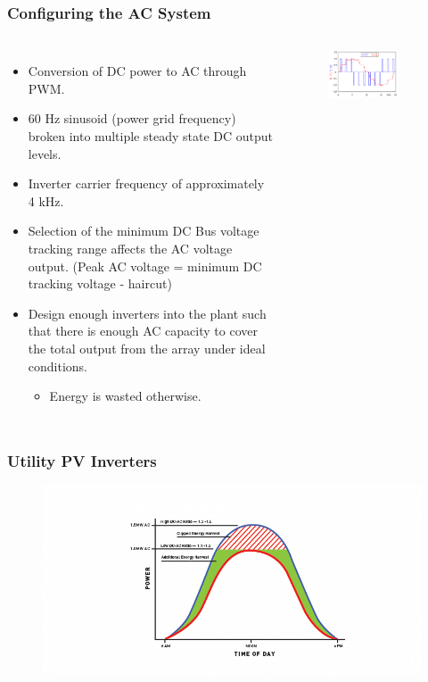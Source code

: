 \documentclass[aspectratio=169]{beamer}
\begin{document}
\begin{frame}
  \frametitle{Configuring the AC System}
  \begin{columns}[t]
    \begin{itemize}
    \item Conversion of DC power to AC through PWM.
    \item 60 Hz sinusoid (power grid frequency) broken into multiple
      steady state DC output levels.
    \item Inverter carrier frequency of approximately 4 kHz.
    \item Selection of the minimum DC Bus voltage tracking range
      affects the AC voltage output. (Peak AC voltage = minimum DC
      tracking voltage - haircut)
    \item Design enough inverters into the plant such that there is
      enough AC capacity to cover the total output from the array
      under ideal conditions.
      \begin{itemize}
      \item Energy is wasted otherwise.
      \end{itemize}
    \end{itemize}

    \begin{figure}
      \includegraphics[width=0.75\textwidth]{PWM.png}
    \end{figure}    
  \end{columns}
\end{frame}

\begin{frame}
  \frametitle{Utility PV Inverters}
  \begin{figure}
    \includegraphics[width=\linewidth]{Inverter_Clipping.png}
  \end{figure}
\end{frame}
\end{document}
